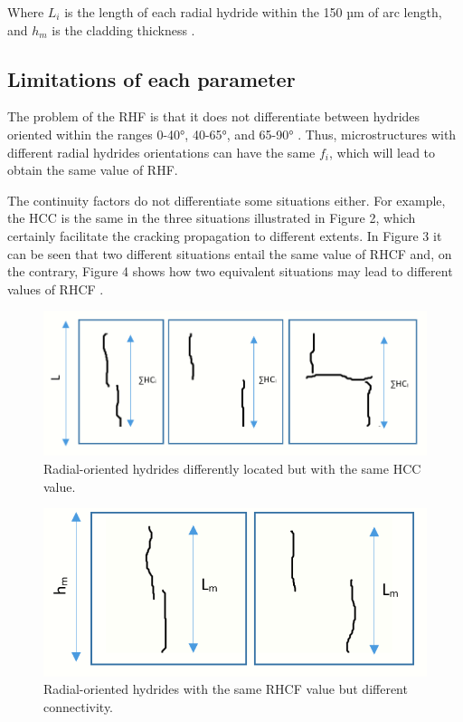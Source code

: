 \documentclass[12pt]{article}
\begin{document}
\vspace{150}
\noindent
Where $L_i$ is the length of each radial hydride within the 150 µm of arc length, and $h_m$ is the cladding thickness \cite{SIMON2021152817}.

\subsection{Limitations of each parameter}

\noindent
The problem of the RHF is that it does not differentiate between hydrides oriented within the ranges 0-40°, 40-65°, and 65-90° \cite{SIMON2021152817}. Thus, microstructures with different radial hydrides orientations can have the same $f_i$, which will lead to obtain the same value of RHF.

\noindent
The continuity factors do not differentiate some situations either. For example, the HCC is the same in the three situations illustrated in Figure 2, which certainly facilitate the cracking propagation to different extents. In Figure 3 it can be seen that two different situations entail the same value of RHCF and, on the contrary, Figure 4 shows how two equivalent situations may lead to different values of RHCF \cite{SIMON2021152817}.

\begin{figure}[h] %
    \centering
    \includegraphics[width=4.5in]{HCC comparison.png}
    \caption{Radial-oriented hydrides differently located but with the same HCC value.}
    \label{fig:my_label}
\end{figure}

\begin{figure}[h] %
    \centering
    \includegraphics[width=4.5in]{RHCF comparison 1.png}
    \caption{Radial-oriented hydrides with the same RHCF value but different connectivity.}
    \label{fig:my_label}
\end{figure}
\end{document}
